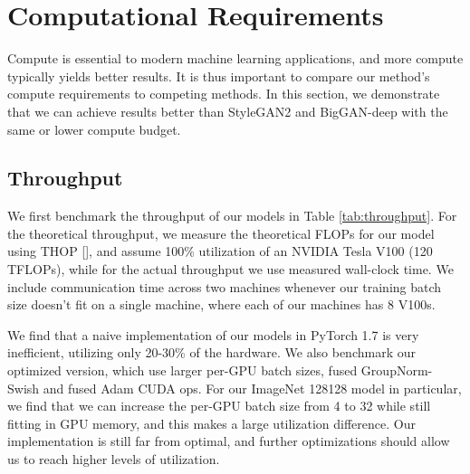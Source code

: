 \documentclass{article}
\newcommand{\shortcite}[1]{[\citenum{#1}]}
\begin{document}
\newpage
\appendix
\section{Computational Requirements}
\label{app:compute}

Compute is essential to modern machine learning applications, and more compute typically yields better results. It is thus important to compare our method's compute requirements to competing methods. In this section, we demonstrate that we can achieve results better than StyleGAN2 and BigGAN-deep with the same or lower compute budget.

\subsection{Throughput}
We first benchmark the throughput of our models in Table \ref{tab:throughput}. For the theoretical throughput, we measure the theoretical FLOPs for our model using THOP \shortcite{thoprepo}, and assume 100\% utilization of an NVIDIA Tesla V100 (120 TFLOPs), while for the actual throughput we use measured wall-clock time. We include communication time across two machines whenever our training batch size doesn't fit on a single machine, where each of our machines has 8 V100s.

We find that a naive implementation of our models in PyTorch 1.7 is very inefficient, utilizing only 20-30\% of the hardware. We also benchmark our optimized version, which use larger per-GPU batch sizes, fused GroupNorm-Swish and fused Adam CUDA ops. For our ImageNet 128128 model in particular, we find that we can increase the per-GPU batch size from 4 to 32 while still fitting in GPU memory, and this makes a large utilization difference. Our implementation is still far from optimal, and further optimizations should allow us to reach higher levels of utilization.
\end{document}
